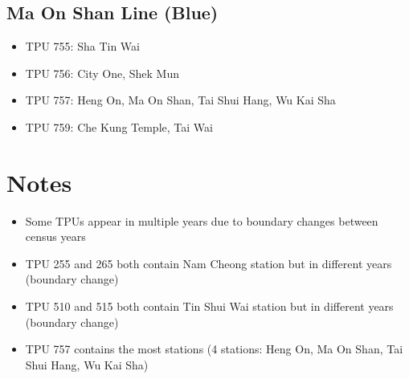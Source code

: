 \documentclass{article}
\begin{document}
\subsection{Ma On Shan Line (Blue)}
\begin{itemize}
    \item TPU 755: Sha Tin Wai
    \item TPU 756: City One, Shek Mun
    \item TPU 757: Heng On, Ma On Shan, Tai Shui Hang, Wu Kai Sha
    \item TPU 759: Che Kung Temple, Tai Wai
\end{itemize}

\section{Notes}

\begin{itemize}
    \item Some TPUs appear in multiple years due to boundary changes between census years
    \item TPU 255 and 265 both contain Nam Cheong station but in different years (boundary change)
    \item TPU 510 and 515 both contain Tin Shui Wai station but in different years (boundary change)
    \item TPU 757 contains the most stations (4 stations: Heng On, Ma On Shan, Tai Shui Hang, Wu Kai Sha)
\end{itemize}
\end{document}
